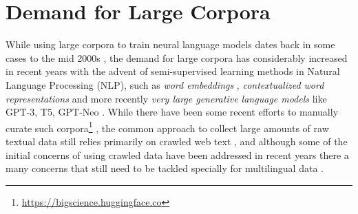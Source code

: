 \section{Demand for Large Corpora}

While using large corpora to train neural language models dates back in some cases to the mid 2000s \citep{schwenk-gauvain-2005-training}, the demand for large corpora has considerably increased in recent years with the advent of semi-supervised learning methods in Natural Language Processing (NLP), such as \emph{word embeddings} \cite{mikolov-etal-2013-distributed,pennington-etal-2014-glove,mikolov-etal-2018-advances}, \emph{contextualized word representations} \cite{howard-ruder-2018-universal,peters-etal-2018-deep,devlin-etal-2019-bert} and more recently \emph{very large generative language models} like GPT-3, T5, GPT-Neo \cite{raffel-etal-2020-exploring,brown-etal-2020-language,black-etal-2021-gpt}. While there have been some recent efforts to manually curate such corpora\footnote{\url{https://bigscience.huggingface.co}} \cite{gao-etal-2020-pile}, the common approach to collect large amounts of raw textual data still relies primarily on crawled web text \cite{ortiz-suarez-etal-2019-asynchronous,ortiz-suarez-etal-2020-monolingual,xue-etal-2021-mt5,el-kishky-etal-2020-ccaligned,espla-etal-2019-paracrawl,banon-etal-2020-paracrawl,gao-etal-2020-pile}, and although some of the initial concerns of using crawled data \cite{trinh-le-2018-a,radford-etal-2019-language} have been addressed in recent years \cite{ortiz-suarez-etal-2020-monolingual,martin-etal-2020-camembert} there a many concerns that still need to be tackled \cite{caswell-etal-2020-language} specially for multilingual data \cite{kreutzer-etal-2021-quality}.

